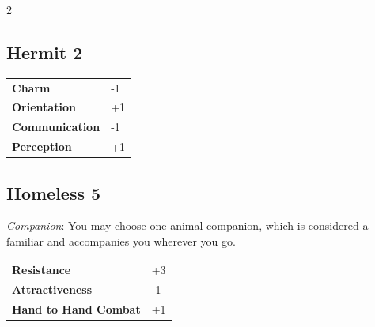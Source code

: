 \begin{multicols}{2}
\begin{tcolorbox}

\end{tcolorbox}

\begin{tcolorbox}
    \subsection*{Hermit \hfill \small{2 }}
    \tcblower




\begin{tabular}{@{}ll@{}}
    \textbf{Charm} & -1\\
    \textbf{Orientation} & +1\\
    \textbf{Communication} & -1\\
    \textbf{Perception} & +1\\
\end{tabular}


\end{tcolorbox}

\begin{tcolorbox}
    \subsection*{Homeless \hfill \small{5 }}
    \tcblower
\textit{Companion}: You may choose one animal companion, which is considered a familiar and accompanies you wherever you go.


\vspace{3mm}

\begin{tabular}{@{}ll@{}}
    \textbf{Resistance} & +3\\
    \textbf{Attractiveness} & -1\\
    \textbf{Hand to Hand Combat} & +1\\
\end{tabular}


\end{tcolorbox}


\end{multicols}

